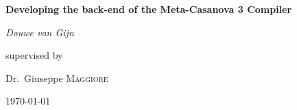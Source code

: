 \documentclass[12pt,a4paper]{report}
\begin{document}
\begin{titlepage}
	\centering
	       {\huge\bfseries Developing the back-end of the Meta-Casanova 3 Compiler \par}
	\vspace{2cm}
	{\Large\itshape Douwe van Gijn\par}
	\vfill
	supervised by\par
	Dr.~Giuseppe \textsc{Maggiore}
	\vfill
	{\large \today\par}
\end{titlepage}
\end{document}
